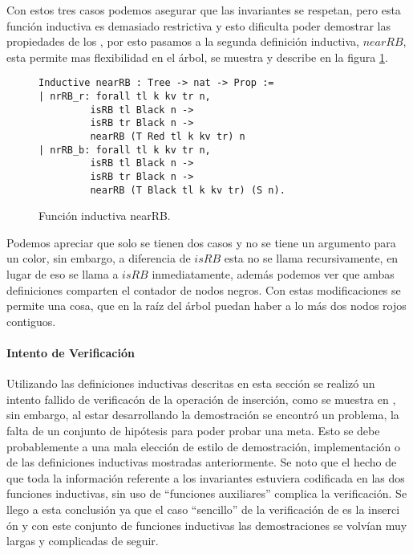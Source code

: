 Con estos tres casos podemos asegurar que las invariantes se respetan, pero esta funci\'on
inductiva es demasiado restrictiva y esto dificulta poder demostrar las propiedades de los {\arns},
por esto pasamos a la segunda definici\'on inductiva, \hyperref[inductive_nearRB]{$nearRB$}, esta 
permite mas flexibilidad en el \'arbol, se muestra y describe en la figura \ref{inductive_nearRB}.
\begin{figure}[!ht]
\centering
\captionsetup{justification=centering}
\begin{verbatim}
Inductive nearRB : Tree -> nat -> Prop :=
| nrRB_r: forall tl k kv tr n,
         isRB tl Black n ->
         isRB tr Black n ->
         nearRB (T Red tl k kv tr) n
| nrRB_b: forall tl k kv tr n,
         isRB tl Black n ->
         isRB tr Black n ->
         nearRB (T Black tl k kv tr) (S n).
\end{verbatim}
\caption{Funci\'on inductiva nearRB.}
\label{inductive_nearRB}
\end{figure}

Podemos apreciar que solo se tienen dos casos y no se tiene un argumento para un color, sin
embargo, a diferencia de \hyperref[inductive_isRB]{$isRB$} esta no se llama recursivamente, en lugar
de eso se llama a \hyperref[inductive_isRB]{$isRB$} inmediatamente, además podemos ver que ambas 
definiciones comparten el contador de nodos negros. Con estas modificaciones se permite una cosa, 
que en la ra\'iz del \'arbol puedan haber a lo m\'as dos nodos rojos contiguos.

\paragraph{Intento de Verificaci\'on}
Utilizando las definiciones inductivas descritas en esta secci\'on se realiz\'o un intento fallido 
de verificac\'on de la operaci\'on de inserci\'on, como se muestra en \cite{appel}, sin embargo, al
estar desarrollando la demostraci\'on se encontró un problema, la falta de un conjunto de
hipótesis para poder probar una meta. Esto se debe probablemente a una mala elección de estilo de
demostraci\'on, implementaci\'on o de las definiciones inductivas mostradas anteriormente. Se noto
que el hecho de que toda la informaci\'on referente a los invariantes estuviera codificada en las
dos funciones inductivas, sin uso de ``funciones auxiliares'' complica la verificaci\'on. Se
llego a esta conclusi\'on ya que el caso ``sencillo'' de la verificaci\'on de {\arns} es la inserci
\'on y con este conjunto de funciones inductivas las demostraciones se volvían muy largas y
complicadas de seguir.


